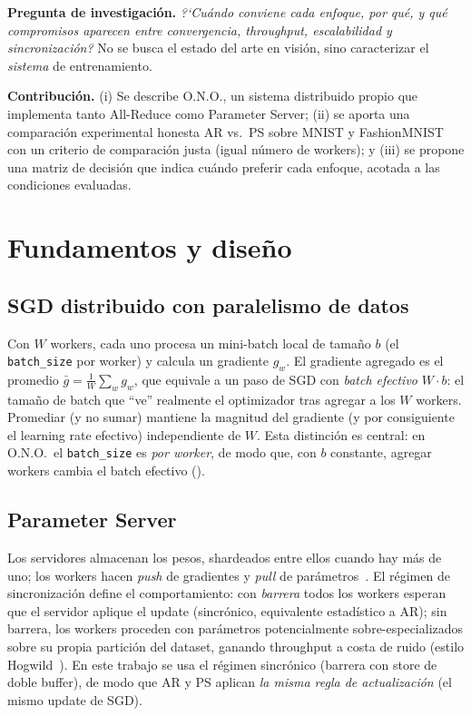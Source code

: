 \documentclass[conference,10pt]{IEEEtran}
\begin{document}
\textbf{Pregunta de investigaci\'on.} \emph{?`Cu\'ando conviene cada enfoque, por
qu\'e, y qu\'e compromisos aparecen entre convergencia, throughput, escalabilidad y
sincronizaci\'on?} No se busca el estado del arte en visi\'on, sino caracterizar el
\emph{sistema} de entrenamiento.

\textbf{Contribuci\'on.} (i) Se describe O.N.O., un sistema distribuido propio que
implementa tanto All-Reduce como Parameter Server; (ii) se aporta una comparaci\'on experimental honesta AR vs.\ PS sobre MNIST y
FashionMNIST con un criterio de comparaci\'on justa (igual n\'umero de workers); y
(iii) se propone una matriz de decisi\'on que indica cu\'ando preferir cada enfoque,
acotada a las condiciones evaluadas.

\section{Fundamentos y dise\~no}

\subsection{SGD distribuido con paralelismo de datos}
Con $W$ workers, cada uno procesa un mini-batch local de tama\~no $b$ (el
\texttt{batch\_size} por worker) y calcula un gradiente $g_w$. El gradiente agregado es
el promedio $\bar{g}=\frac{1}{W}\sum_w g_w$, que equivale a un paso de SGD con
\emph{batch efectivo} $W\cdot b$: el tama\~no de batch que ``ve'' realmente el
optimizador tras agregar a los $W$ workers. Promediar (y no sumar) mantiene la magnitud
del gradiente (y por consiguiente el learning rate efectivo) independiente de $W$.
Esta distinci\'on es central: en O.N.O.\ el \texttt{batch\_size} es \emph{por worker},
de modo que, con $b$ constante, agregar workers cambia el batch efectivo
().

\subsection{Parameter Server}
Los servidores almacenan los pesos, shardeados entre ellos cuando hay m\'as de uno; los
workers hacen \emph{push} de gradientes y \emph{pull} de
par\'ametros~\cite{li2014scaling}. El r\'egimen de sincronizaci\'on define el
comportamiento: con \emph{barrera} todos los workers esperan que el servidor aplique el
update (sincr\'onico, equivalente estad\'istico a AR); sin barrera, los workers
proceden con par\'ametros potencialmente sobre-especializados sobre su propia partici\'on
del dataset, ganando throughput a costa de ruido (estilo
Hogwild~\cite{recht2011hogwild}). En este trabajo se usa el r\'egimen sincr\'onico
(barrera con store de doble buffer), de modo que AR y PS aplican \emph{la misma regla de
actualizaci\'on} (el mismo update de SGD).
\end{document}
